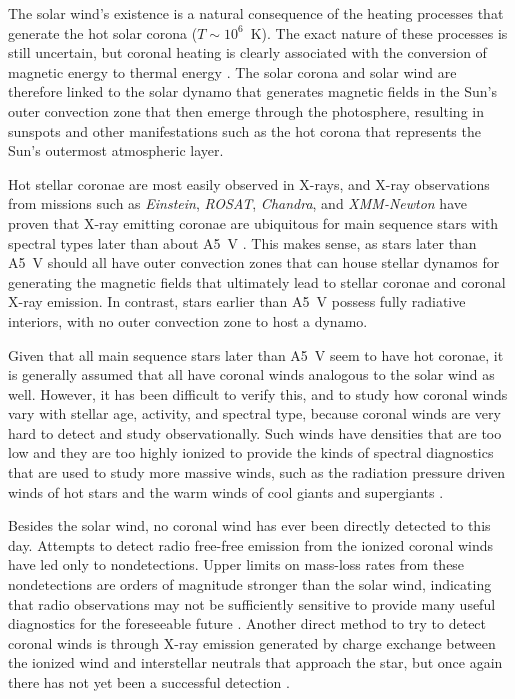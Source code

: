 \documentclass[preprint]{aastex}
\begin{document}
     The solar wind's existence is a natural consequence of the
heating processes that generate the hot solar corona ($T\sim 10^6$~K).
The exact nature of these processes is still uncertain, but coronal
heating is clearly associated with the conversion of magnetic energy
to thermal energy \citep{src12,src19}.
The solar corona and solar wind
are therefore linked to the solar dynamo that generates magnetic fields
in the Sun's outer convection zone that then emerge through the
photosphere, resulting in sunspots and other manifestations such as the
hot corona that represents the Sun's outermost atmospheric layer.

     Hot stellar coronae are most easily observed in X-rays, and X-ray
observations from missions such as {\em Einstein}, {\em ROSAT},
{\em Chandra}, and {\em XMM-Newton} have proven that X-ray emitting coronae
are ubiquitous for main sequence stars with spectral types later than
about A5~V \citep{js85,mg04}.  This makes
sense, as stars later than A5~V should all have outer convection zones
that can house stellar dynamos for generating the magnetic fields that
ultimately lead to stellar coronae and coronal X-ray emission.
In contrast, stars earlier than A5~V possess fully radiative interiors,
with no outer convection zone to host a dynamo.

     Given that all main sequence stars later than A5~V seem to have
hot coronae, it is generally assumed that all have coronal winds analogous
to the solar wind as well.  However, it has been difficult to
verify this, and to study how coronal winds vary with
stellar age, activity, and spectral type, because coronal winds are very
hard to detect and study observationally.  Such winds have densities
that are too low and they are too highly ionized to provide the kinds of
spectral diagnostics that are used to study more massive winds, such as
the radiation pressure driven winds of hot stars \citep{jp08} and
the warm winds of cool giants and supergiants
\citep{bew16,sh18,gr18}.

     Besides the solar wind, no coronal wind has ever been
directly detected to this day.  Attempts to detect radio free-free
emission from the ionized coronal winds have led only to nondetections.
Upper limits on mass-loss rates from these nondetections are orders of
magnitude stronger than the solar wind, indicating that radio
observations may not be sufficiently sensitive to provide many
useful diagnostics for the foreseeable future \citep{bf17}.
Another direct method to try to detect coronal winds is through
X-ray emission generated by charge exchange between the ionized wind
and interstellar neutrals that approach the star, but once again there
has not yet been a successful detection \citep{bjw02}.
\end{document}
